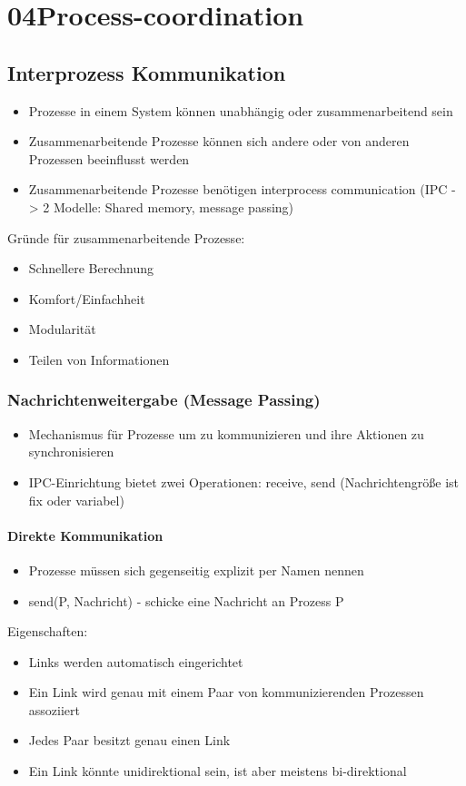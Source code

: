 \documentclass[a4paper]{scrreprt}
\begin{document}
\chapter{04Process-coordination}

\section{Interprozess Kommunikation}
	\begin{itemize}
		\item Prozesse in einem System können unabhängig oder zusammenarbeitend sein
		\item Zusammenarbeitende Prozesse können sich andere oder von anderen Prozessen beeinflusst werden
		\item Zusammenarbeitende Prozesse benötigen interprocess communication (IPC -> 2 Modelle: Shared memory, message passing)
	\end{itemize}
	Gründe für zusammenarbeitende Prozesse:
	\begin{itemize}
		\item Schnellere Berechnung
		\item Komfort/Einfachheit
		\item Modularität
		\item Teilen von Informationen
	\end{itemize}

\subsection{Nachrichtenweitergabe (Message Passing)}
	\begin{itemize}
		\item Mechanismus für Prozesse um zu kommunizieren und ihre Aktionen zu synchronisieren
		\item IPC-Einrichtung bietet zwei Operationen: receive, send (Nachrichtengröße ist fix oder variabel)
	\end{itemize}
\subsubsection {Direkte Kommunikation}
	\begin{itemize}
		\item Prozesse müssen sich gegenseitig explizit per Namen nennen
		\item send(P, Nachricht) - schicke eine Nachricht an Prozess P
	\end{itemize}
	Eigenschaften:
	\begin{itemize}
		\item Links werden automatisch eingerichtet
		\item Ein Link wird genau mit einem Paar von kommunizierenden Prozessen assoziiert
		\item Jedes Paar besitzt genau einen Link
		\item Ein Link könnte unidirektional sein, ist aber meistens bi-direktional
	\end{itemize}
	
\end{document}
